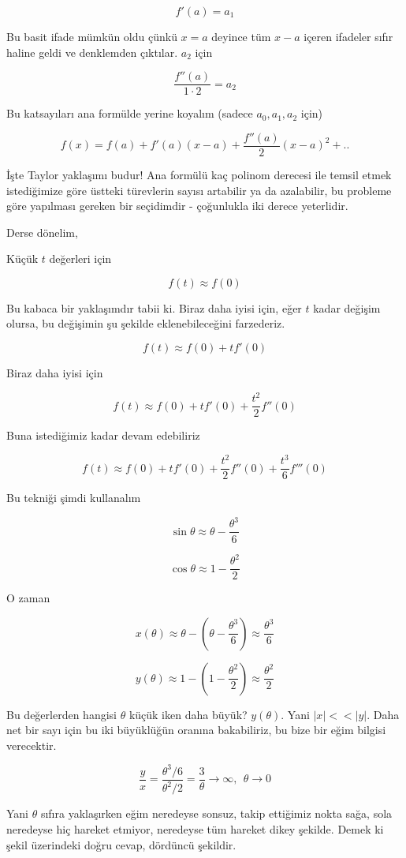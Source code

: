 \documentclass[12pt,fleqn]{article}\usepackage{../../common}
\begin{document}
$$ f'(a) = a_1  $$

Bu basit ifade mümkün oldu çünkü $x=a$ deyince tüm $x-a$ içeren ifadeler
sıfır haline geldi ve denklemden çıktılar. $a_2$ için

$$ \frac{f''(a)}{1 \cdot 2} = a_2  $$

Bu katsayıları ana formülde yerine koyalım (sadece $a_0,a_1,a_2$ için)

$$ f(x) = f(a) + f'(a)(x-a) + \frac{f''(a)}{2}(x-a)^2 + .. $$

İşte Taylor yaklaşımı budur! Ana formülü kaç polinom derecesi ile temsil etmek
istediğimize göre üstteki türevlerin sayısı artabilir ya da azalabilir, bu
probleme göre yapılması gereken bir seçidimdir - çoğunlukla iki derece
yeterlidir.

Derse dönelim,

Küçük $t$ değerleri için 

$$ f(t) \approx f(0) $$

Bu kabaca bir yaklaşımdır tabii ki. Biraz daha iyisi için, eğer $t$
kadar değişim olursa, bu değişimin şu şekilde eklenebileceğini farzederiz.

$$ f(t) \approx f(0) + tf'(0)$$

Biraz daha iyisi için

$$ f(t) \approx f(0) + tf'(0) + \frac{t^2}{2}f''(0)$$

Buna istediğimiz kadar devam edebiliriz

$$ f(t) \approx f(0) + tf'(0) + \frac{t^2}{2}f''(0) + \frac{t^3}{6}f'''(0)$$

Bu tekniği şimdi kullanalım

$$ \sin \theta \approx \theta - \frac{\theta^3}{6} $$

$$ \cos \theta \approx 1 - \frac{\theta^2}{2} $$

O zaman

$$ x(\theta) \approx \theta - (\theta  - \frac{\theta^3}{6}) 
\approx \frac{\theta^3}{6} 
$$

$$ y(\theta) \approx 1 - (1  - \frac{\theta^2}{2}) 
\approx \frac{\theta^2}{2} 
$$

Bu değerlerden hangisi $\theta$ küçük iken daha büyük? $y(\theta)$. Yani
$|x| << |y|$. Daha net bir sayı için bu iki büyüklüğün oranına bakabiliriz,
bu bize bir eğim bilgisi verecektir. 

$$ \frac{y}{x} = \frac{\theta^3/6}{\theta^2/2 } = 
\frac{3}{\theta} \to \infty, \ \ \theta \to 0
$$

Yani $\theta$ sıfıra yaklaşırken eğim neredeyse sonsuz, takip ettiğimiz
nokta sağa, sola neredeyse hiç hareket etmiyor, neredeyse tüm hareket dikey
şekilde. Demek ki şekil üzerindeki doğru cevap, dördüncü şekildir. 
\end{document}
